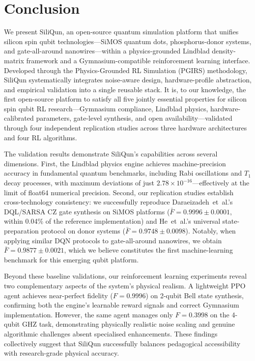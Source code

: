 \section{Conclusion}
\label{sec:conclusion}

We present SiliQun, an open-source quantum simulation platform that unifies silicon spin qubit technologies—SiMOS quantum dots, phosphorus-donor systems, and gate-all-around nanowires—within a physics-grounded Lindblad density-matrix framework and a Gymnasium-compatible reinforcement learning interface. Developed through the Physics-Grounded RL Simulation (PGIRS) methodology, SiliQun systematically integrates noise-aware design, hardware-profile abstraction, and empirical validation into a single reusable stack. It is, to our knowledge, the first open-source platform to satisfy all five jointly essential properties for silicon spin qubit RL research—Gymnasium compliance, Lindblad physics, hardware-calibrated parameters, gate-level synthesis, and open availability—validated through four independent replication studies across three hardware architectures and four RL algorithms.

The validation results demonstrate SiliQun's capabilities across several dimensions. First, the Lindblad physics engine achieves machine-precision accuracy in fundamental quantum benchmarks, including Rabi oscillations and $T_1$ decay processes, with maximum deviations of just $2.78 \times 10^{-16}$---effectively at the limit of float64 numerical precision. Second, our replication studies establish cross-technology consistency: we successfully reproduce Daraeizadeh~et~al.'s DQL/SARSA CZ gate synthesis on SiMOS platforms ($\bar{F} = 0.9996 \pm 0.0001$, within 0.04\% of the reference implementation) and He~et~al.'s universal state-preparation protocol on donor systems ($\bar{F} = 0.9748 \pm 0.0098$). Notably, when applying similar DQN protocols to gate-all-around nanowires, we obtain $\bar{F} = 0.9877 \pm 0.0021$, which we believe constitutes the first machine-learning benchmark for this emerging qubit platform.

Beyond these baseline validations, our reinforcement learning experiments reveal two complementary aspects of the system's physical realism. A lightweight PPO agent achieves near-perfect fidelity ($F = 0.9996$) on 2-qubit Bell state synthesis, confirming both the engine's learnable reward signals and correct Gymnasium implementation. However, the same agent manages only $F = 0.3998$ on the 4-qubit GHZ task, demonstrating physically realistic noise scaling and genuine algorithmic challenges absent specialised enhancements. These findings collectively suggest that SiliQun successfully balances pedagogical accessibility with research-grade physical accuracy.

